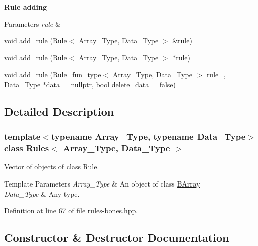 \begin{Indent}\textbf{ Rule adding}\par
{\em 
\begin{DoxyParams}{Parameters}
{\em rule} & \\
\hline
\end{DoxyParams}
}\begin{DoxyCompactItemize}
\item 
void \hyperlink{class_rules_a60583152fddcb11178dcf3d02a924d7c}{add\+\_\+rule} (\hyperlink{class_rule}{Rule}$<$ Array\+\_\+\+Type, Data\+\_\+\+Type $>$ \&rule)
\item 
void \hyperlink{class_rules_abd60b1d381ad0c8a772e4d81264bbe0a}{add\+\_\+rule} (\hyperlink{class_rule}{Rule}$<$ Array\+\_\+\+Type, Data\+\_\+\+Type $>$ $\ast$rule)
\item 
void \hyperlink{class_rules_abbc63747014445b538384bb500464bb5}{add\+\_\+rule} (\hyperlink{typedefs_8hpp_a99982bdca40c23ca6f901c8e66da78a1}{Rule\+\_\+fun\+\_\+type}$<$ Array\+\_\+\+Type, Data\+\_\+\+Type $>$ rule\+\_\+, Data\+\_\+\+Type $\ast$data\+\_\+=nullptr, bool delete\+\_\+data\+\_\+=false)
\end{DoxyCompactItemize}
\end{Indent}


\subsection{Detailed Description}
\subsubsection*{template$<$typename Array\+\_\+\+Type, typename Data\+\_\+\+Type$>$\newline
class Rules$<$ Array\+\_\+\+Type, Data\+\_\+\+Type $>$}

Vector of objects of class \hyperlink{class_rule}{Rule}. 


\begin{DoxyTemplParams}{Template Parameters}
{\em Array\+\_\+\+Type} & An object of class {\ttfamily \hyperlink{class_b_array}{B\+Array}} \\
\hline
{\em Data\+\_\+\+Type} & Any type. \\
\hline
\end{DoxyTemplParams}


Definition at line 67 of file rules-\/bones.\+hpp.



\subsection{Constructor \& Destructor Documentation}
\mbox{\label{class_rules_aa78e9abf82ed8a0e4320d570191c8968}} 

